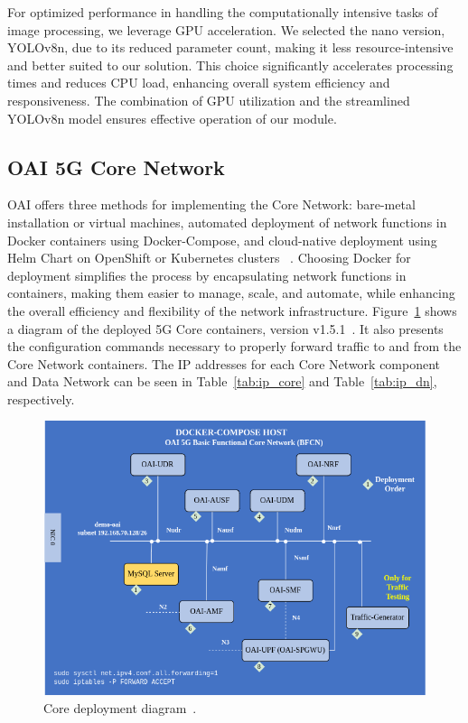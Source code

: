 For optimized performance in handling the computationally intensive tasks of image processing, we leverage GPU acceleration.
We selected the nano version, YOLOv8n, due to its reduced parameter count, making it less resource-intensive and better suited to our solution.
This choice significantly accelerates processing times and reduces CPU load, enhancing overall system efficiency and responsiveness.
The combination of GPU utilization and the streamlined YOLOv8n model ensures effective operation of our module.



\subsection{OAI 5G Core Network}\label{subsec:oai-5g-core-network}
OAI offers three methods for implementing the Core Network: bare-metal installation or virtual machines, automated deployment of network functions in Docker containers using Docker-Compose, and cloud-native deployment using Helm Chart on OpenShift or Kubernetes clusters ~\cite{oai5gcore}.
Choosing Docker for deployment simplifies the process by encapsulating network functions in containers, making them easier to manage, scale, and automate, while enhancing the overall efficiency and flexibility of the network infrastructure.
Figure~\ref{fig:core_depl} shows a diagram of the deployed 5G Core containers, version v1.5.1~\cite{oai-cn5g-fed-v1.5.1}.
It also presents the configuration commands necessary to properly forward traffic to and from the Core Network containers.
The IP addresses for each Core Network component and Data Network can be seen in Table~\ref{tab:ip_core} and Table~\ref{tab:ip_dn}, respectively.


\begin{figure}[H]
    \centering
    \includegraphics[width=0.7\linewidth]{figures/core_deply}
    \caption[Core deployment diagram]{Core deployment diagram~\cite{oai_cn5g_fed_deploy}.}
    \label{fig:core_depl}
\end{figure}


